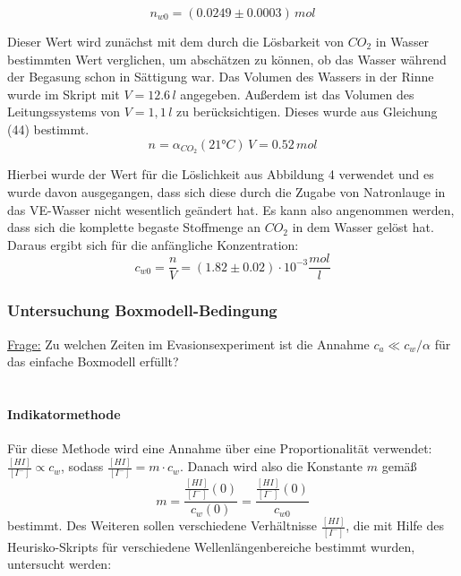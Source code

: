 \documentclass[12pt]{article}
\begin{document}
\begin{equation}
n_{w0} = (0.0249 \pm 0.0003) \,mol
\end{equation}

Dieser Wert wird zun\"achst mit dem durch die Lösbarkeit von $CO_2$ in Wasser bestimmten Wert verglichen, um absch\"atzen zu können, ob das Wasser w\"ahrend der Begasung schon in S\"attigung war. Das Volumen des Wassers in der Rinne wurde im Skript mit $V = 12.6 \,l $ angegeben. Außerdem ist das Volumen des Leitungssystems von $V=1,1 \,l $ zu ber\"ucksichtigen. Dieses wurde aus Gleichung (44) \cite{jaehne} bestimmt.
\begin{equation}
n = \alpha_{CO_2}(21 °C) \, V = 0.52 \, mol
\end{equation}

Hierbei wurde der Wert für die L\"oslichkeit aus Abbildung 4 \cite{jaehne} verwendet und es wurde davon ausgegangen, dass sich diese durch die Zugabe von Natronlauge in das VE-Wasser nicht wesentlich geändert hat. Es kann also angenommen werden, dass sich die komplette begaste Stoffmenge an $CO_2$ in dem Wasser gelöst hat. Daraus ergibt sich für die anfängliche Konzentration:
\begin{equation}
c_{w0} = \frac{n}{V} = (1.82 \pm 0.02)\cdot 10^{-3} \frac{mol}{l}
\end{equation}

\subsubsection{Untersuchung Boxmodell-Bedingung}

\underline{Frage:} Zu welchen Zeiten im Evasionsexperiment ist die Annahme $c_a \ll c_w/\alpha $ für das einfache Boxmodell erfüllt? \\ \\

\paragraph{Indikatormethode\\}

Für diese Methode wird eine Annahme über eine Proportionalität verwendet: $\frac{[HI]}{[I^-]} \propto c_w $, sodass $\frac{[HI]}{[I^-]} = m \cdot c_w $. Danach wird also die Konstante $m$ gemäß
\begin{equation}
m = \frac{\frac{[HI]}{[I^-]}(0)}{c_w(0)} = \frac{\frac{[HI]}{[I^-]}(0)}{c_{w0}}
\end{equation}
bestimmt. Des Weiteren sollen verschiedene Verhältnisse $\frac{[HI]}{[I^-]}$, die mit Hilfe des Heurisko-Skripts für verschiedene Wellenlängenbereiche bestimmt wurden, untersucht werden: \\
\end{document}
